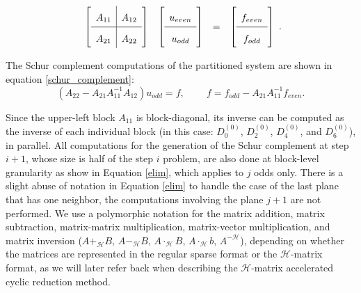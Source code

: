 \documentclass[]{elsarticle}
\begin{document}
\begin{equation}
{\renewcommand{\arraystretch}{1.8}
\begin{array}{cccc}
\left[\begin{array}{c|c}
A_{11} 	& A_{12} \\ \hline 
A_{21} 	& A_{22} \\\end{array}\right]
&
\left[\begin{array}{c}
u_{even} \\ \hline 
u_{odd} \\\end{array}\right]
&
=
&
\left[\begin{array}{c}
f_{even} \\ \hline 
f_{odd} \\\end{array}\right]
\end{array}.
\label{partition}
}
\end{equation}

The Schur complement computations of the partitioned system are shown in equation \ref{schur_complement}: 
\begin{equation}
(A_{22}-A_{21}A_{11}^{-1}A_{12})u_{odd}=f,\;\;\;\;\;\;\;\; f = f_{odd}-A_{21}A_{11}^{-1}f_{even}.
\label{schur_complement}
\end{equation}

Since the upper-left block $A_{11}$ is block-diagonal, its inverse can be computed as the inverse of each individual block (in this case: $D_0^{(0)}$, $D_2^{(0)}$, $D_4^{(0)}$, and $D_6^{(0)}$), in parallel. All computations for the generation of the Schur complement at step $i+1$, whose size is half of the step $i$ problem, are also done at block-level granularity as show in Equation \ref{elim}, which applies to $j$ odds only. There is a slight abuse of notation in Equation \ref{elim} to handle the case of the last plane that has one neighbor, the computations involving the plane $j+1$ are not performed. We use a polymorphic notation for the matrix addition, matrix subtraction, matrix-matrix multiplication, matrix-vector multiplication, and matrix inversion ($A+_{\mathcal{H}}B, \, A-_{\mathcal{H}}B, \, A\cdot_{\mathcal{H}}B, \, A\cdot_{\mathcal{H}}b, \, A^{-\mathcal{H}}$), depending on whether the matrices are represented in the regular sparse format or the $\mathcal{H}$-matrix format, as we will later refer back when describing the $\mathcal{H}$-matrix accelerated cyclic reduction method.
\end{document}
